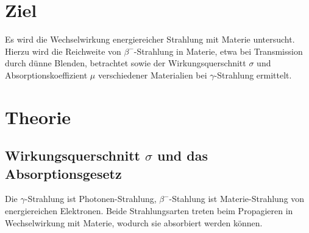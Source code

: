 \section{Ziel}
\label{sec:Ziel}
Es wird die Wechselwirkung energiereicher Strahlung mit Materie untersucht.
Hierzu wird die Reichweite von $\beta^-$-Strahlung in Materie, etwa bei Transmission durch dünne Blenden, betrachtet sowie der Wirkungsquerschnitt $\sigma$ und Absorptionskoeffizient $\mu$ verschiedener Materialien bei $\gamma$-Strahlung ermittelt.

\section{Theorie}
\label{sec:Theorie}

\subsection{Wirkungsquerschnitt \texorpdfstring{$\sigma$}{Sigma} und das Absorptionsgesetz}
\label{sec:absorp}
Die $\gamma$-Strahlung ist Photonen-Strahlung, $\beta^-$-Stahlung ist Materie-Strahlung von energiereichen Elektronen.
Beide Strahlungsarten treten beim Propagieren in Wechselwirkung mit Materie, wodurch sie absorbiert werden können.

